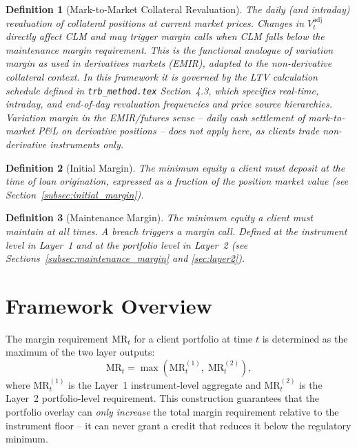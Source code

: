 \documentclass[12pt, a4paper]{article}
\newtheorem{definition}{Definition}[section]
\newcommand{\MR}{\mathrm{MR}}
\begin{document}
\begin{definition}[Mark-to-Market Collateral Revaluation]
The daily (and intraday) revaluation of collateral positions at current
market prices. Changes in $V_t^{\mathrm{adj}}$ directly affect CLM and
may trigger margin calls when CLM falls below the maintenance margin
requirement. This is the functional analogue of \emph{variation margin} as
used in derivatives markets (EMIR), adapted to the non-derivative collateral
context. In this framework it is governed by the LTV calculation schedule
defined in \texttt{trb\_method.tex} Section~4.3, which specifies real-time,
intraday, and end-of-day revaluation frequencies and price source hierarchies.
\emph{Variation margin in the EMIR/futures sense -- daily cash settlement of
mark-to-market P\&L on derivative positions -- does not apply here, as
clients trade non-derivative instruments only.}
\end{definition}

\begin{definition}[Initial Margin]
The minimum equity a client must deposit at the time of loan origination,
expressed as a fraction of the position market value (see
Section~\ref{subsec:initial_margin}).
\end{definition}

\begin{definition}[Maintenance Margin]
The minimum equity a client must maintain at all times. A breach triggers
a margin call. Defined at the instrument level in Layer~1 and at the
portfolio level in Layer~2 (see Sections~\ref{subsec:maintenance_margin}
and \ref{sec:layer2}).
\end{definition}

\section{Framework Overview}
\label{sec:overview}

The margin requirement $\MR_t$ for a client portfolio at time $t$ is
determined as the maximum of the two layer outputs:
\begin{equation}
    \MR_t = \max\!\left(\MR_t^{(1)},\; \MR_t^{(2)}\right),
    \label{eq:mr_total}
\end{equation}
where $\MR_t^{(1)}$ is the Layer~1 instrument-level aggregate and
$\MR_t^{(2)}$ is the Layer~2 portfolio-level requirement. This construction
guarantees that the portfolio overlay can \emph{only increase} the total
margin requirement relative to the instrument floor -- it can never grant
a credit that reduces it below the regulatory minimum.
\end{document}
